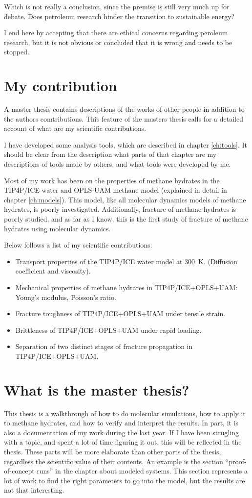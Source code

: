 Which is not really a conclusion, since the premise is still very much up for debate. Does petroleum research hinder the transition to sustainable energy?

I end here by accepting that there are ethical concerns regarding peroleum research, but it is not obvious or concluded that it is wrong and needs to be stopped. 

\section{My contribution}
A master thesis contains descriptions of the works of other people in addition to the authors comtributions. This feature of the masters thesis calls for a detailed account of what are my scientific contributions.

I have developed some analysis tools, which are described in chapter \ref{ch:tools}. It should be clear from the description what parts of that chapter are my descriptions of tools made by others, and what tools were developed by me.

Most of my work has been on the properties of methane hydrates in the TIP4P/ICE water and OPLS-UAM methane model (explained in detail in chapter \ref{ch:models}). This model, like all molecular dynamics models of methane hydrates, is poorly investigated. Additionally, fracture of methane hydrates is poorly studied, and as far as I know, this is the first study of fracture of methane hydrates using molecular dynamics. 

Below follows a list of my scientific contributions:

\begin{itemize}
\item Transport properties of the TIP4P/ICE water model at \SI{300}{\kelvin}. (Diffusion coefficient and viscosity).
\item Mechanical properties of methane hydrates in TIP4P/ICE+OPLS+UAM: Young's modulus, Poisson's ratio.
\item Fracture toughness of TIP4P/ICE+OPLS+UAM under tensile strain.
\item Brittleness of TIP4P/ICE+OPLS+UAM under rapid loading.
\item Separation of two distinct stages of fracture propagation in TIP4P/ICE+OPLS+UAM. 
\end{itemize}


\section{What is the master thesis?}
This thesis is a walkthrough of how to do molecular simulations, how to apply it to methane hydrates, and how to verify and interpret the results. In part, it is also a documentation of my work during the last year. If I have been strugling with a topic, and spent a lot of time figuring it out, this will be reflected in the thesis. These parts will be more elaborate than other parts of the thesis, regardless the scientific value of their contents. An example is the section ``proof-of-concept runs'' in the chapter about modeled systems.  This section represents a lot of work to find the right parameters to go into the model, but the results are not that interesting.

